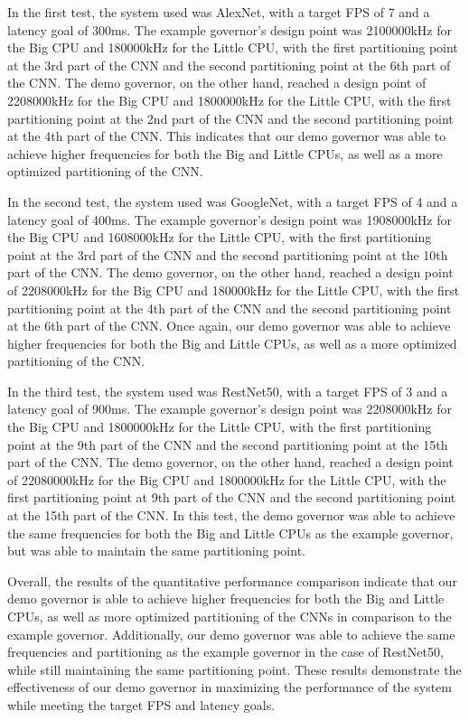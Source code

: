 \documentclass[a4paper, 12pt, fleqn]{article}
\begin{document}
In the first test, the system used was AlexNet, with a target FPS of 7 and a latency goal of 300ms. The example governor's design point was 2100000kHz for the Big CPU and 180000kHz for the Little CPU, with the first partitioning point at the 3rd part of the CNN and the second partitioning point at the 6th part of the CNN. The demo governor, on the other hand, reached a design point of 2208000kHz for the Big CPU and 1800000kHz for the Little CPU, with the first partitioning point at the 2nd part of the CNN and the second partitioning point at the 4th part of the CNN. This indicates that our demo governor was able to achieve higher frequencies for both the Big and Little CPUs, as well as a more optimized partitioning of the CNN.

In the second test, the system used was GoogleNet, with a target FPS of 4 and a latency goal of 400ms. The example governor's design point was 1908000kHz for the Big CPU and 1608000kHz for the Little CPU, with the first partitioning point at the 3rd part of the CNN and the second partitioning point at the 10th part of the CNN. The demo governor, on the other hand, reached a design point of 2208000kHz for the Big CPU and 180000kHz for the Little CPU, with the first partitioning point at the 4th part of the CNN and the second partitioning point at the 6th part of the CNN. Once again, our demo governor was able to achieve higher frequencies for both the Big and Little CPUs, as well as a more optimized partitioning of the CNN.

In the third test, the system used was RestNet50, with a target FPS of 3 and a latency goal of 900ms. The example governor's design point was 2208000kHz for the Big CPU and 1800000kHz for the Little CPU, with the first partitioning point at the 9th part of the CNN and the second partitioning point at the 15th part of the CNN. The demo governor, on the other hand, reached a design point of 22080000kHz for the Big CPU and 1800000kHz for the Little CPU, with the first partitioning point at 9th part of the CNN and the second partitioning point at the 15th part of the CNN. In this test, the demo governor was able to achieve the same frequencies for both the Big and Little CPUs as the example governor, but was able to maintain the same partitioning point.

Overall, the results of the quantitative performance comparison indicate that our demo governor is able to achieve higher frequencies for both the Big and Little CPUs, as well as more optimized partitioning of the CNNs in comparison to the example governor. Additionally, our demo governor was able to achieve the same frequencies and partitioning as the example governor in the case of RestNet50, while still maintaining the same partitioning point. These results demonstrate the effectiveness of our demo governor in maximizing the performance of the system while meeting the target FPS and latency goals.
\end{document}
